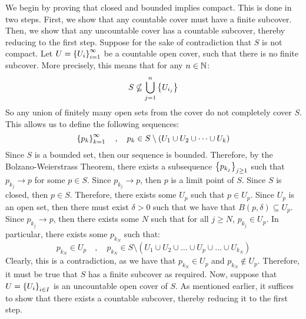 \begin{pf}
    We begin by proving that closed and bounded implies compact. This is done in two steps.
    First, we show that any countable cover must have a finite subcover.
    Then, we show that any uncountable cover has a countable subcover,
    thereby reducing to the first step. \vsp
    Suppose for the sake of contradiction that $ S $ is not compact.
    Let $ U = \left\{{U_{i}}\right\}_{i=1}^{\infty} $ be a countable open cover,
    such that there is no finite subcover.
    More precisely, this means that for any $ n \in \mathbb{N} $:
    \begin{equation*}
        S \nsubseteq \bigcup_{j = 1}^{n} \left\{{U_{i_{j}}}\right\} 
    \end{equation*}
    So any union of finitely many open sets from the cover do not completely cover $ S $.
    This allows us to define the following sequences:
    \begin{equation*}
        \left\{{p_{k}}\right\}_{k=1}^{\infty} \quad , \quad p_{k} \in
        S \setminus (U_{1} \cup U_{2} \cup \dots \cup U_{k})
    \end{equation*}
    Since $ S $ is a bounded set, then our sequence is bounded.
    Therefore, by the Bolzano-Weierstrass Theorem, there exists a subsequence
    $ \left\{{p_{k_{j}}}\right\}_{j \geq 1} $ such that $ p_{k_{j}} \rightarrow p $ for some $ p \in S $. \vsp
    Since $ p_{k_{j}} \rightarrow p $, then $ p $ is a limit point of $ S $.
    Since $ S $ is closed, then $ p \in S $.
    Therefore, there exists some $ U_{p} $ such that $ p \in U_{p} $.
    Since $ U_{p} $ is an open set, then there must exist $ \delta > 0 $ such that
    we have that $ B(p, \delta) \subseteq U_{p} $. \vsp
    Since $ p_{k_{j}} \rightarrow p $, then there exists some $ N $ such that
    for all $ j \geq N $, $ p_{k_{j}} \in U_{p} $.
    In particular, there exists some $ p_{k_{N}} $ such that:
    \begin{equation*}
        p_{k_{N}} \in U_{p} \quad , \quad p_{k_{N}} \in
        S \setminus (U_{1} \cup U_{2} \cup \dots \cup U_{p} \cup \dots \cup U_{k_{N}})
    \end{equation*}
    Clearly, this is a contradiction, as we have that
    $ p_{k_{N}} \in U_{p} $ and $ p_{k_{N}} \notin U_{p} $.
    Therefore, it must be true that $ S $ has a finite subcover as required. \vsp
    Now, suppose that $ U = \left\{{U_{i}}\right\}_{i \in I} $ is an uncountable open cover of $ S $.
    As mentioned earlier, it suffices to show that there exists a countable subcover,
    thereby reducing it to the first step. \vsp

\end{pf}
